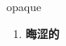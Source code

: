 
\begin{frame}
{\huge opaque}
\begin{center}
\begin{enumerate}\Large
  \item \textbf{晦涩的}
\end{enumerate}
\end{center}
\end{frame}
